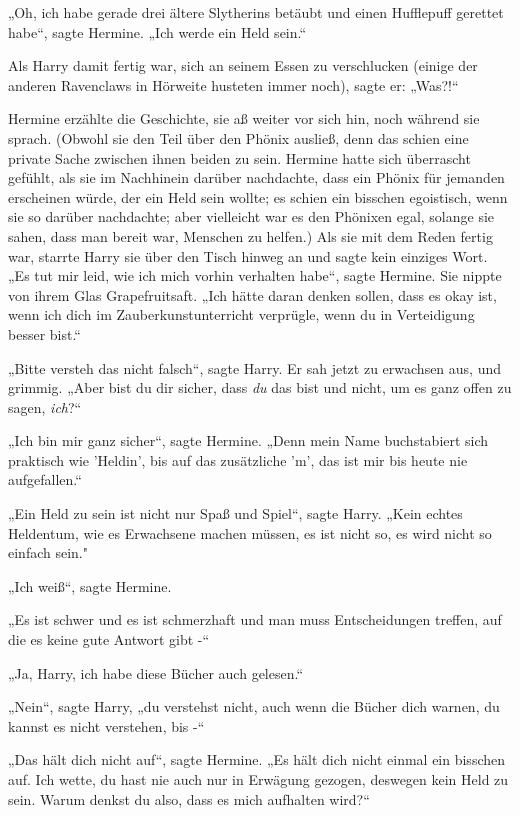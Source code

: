 {„Oh, ich habe gerade drei ältere Slytherins betäubt und einen Hufflepuff gerettet habe“, sagte Hermine. „Ich werde ein Held sein.“

Als Harry damit fertig war, sich an seinem Essen zu verschlucken (einige der anderen Ravenclaws in Hörweite husteten immer noch), sagte er: „Was?!“

Hermine erzählte die Geschichte, sie aß weiter vor sich hin, noch während sie sprach. (Obwohl sie den Teil über den Phönix ausließ, denn das schien eine private Sache zwischen ihnen beiden zu sein. Hermine hatte sich überrascht gefühlt, als sie im Nachhinein darüber nachdachte, dass ein Phönix für jemanden erscheinen würde, der ein Held sein wollte; es schien ein bisschen egoistisch, wenn sie so darüber nachdachte; aber vielleicht war es den Phönixen egal, solange sie sahen, dass man bereit war, Menschen zu helfen.) Als sie mit dem Reden fertig war, starrte Harry sie über den Tisch hinweg an und sagte kein einziges Wort. „Es tut mir leid, wie ich mich vorhin verhalten habe“, sagte Hermine. Sie nippte von ihrem Glas Grapefruitsaft. „Ich hätte daran denken sollen, dass es okay ist, wenn ich dich im Zauberkunstunterricht verprügle, wenn du in Verteidigung besser bist.“

„Bitte versteh das nicht falsch“, sagte Harry. Er sah jetzt zu erwachsen aus, und grimmig. „Aber bist du dir sicher, dass \emph{du} das bist und nicht, um es ganz offen zu sagen, \emph{ich}?“

„Ich bin mir ganz sicher“, sagte Hermine. „Denn mein Name buchstabiert sich praktisch wie 'Heldin', bis auf das zusätzliche 'm', das ist mir bis heute nie aufgefallen.“

„Ein Held zu sein ist nicht nur Spaß und Spiel“, sagte Harry. „Kein echtes Heldentum, wie es Erwachsene machen müssen, es ist nicht so, es wird nicht so einfach sein."

„Ich weiß“, sagte Hermine.

„Es ist schwer und es ist schmerzhaft und man muss Entscheidungen treffen, auf die es keine gute Antwort gibt -“

„Ja, Harry, ich habe diese Bücher auch gelesen.“

„Nein“, sagte Harry, „du verstehst nicht, auch wenn die Bücher dich warnen, du kannst es nicht verstehen, bis -“

„Das hält dich nicht auf“, sagte Hermine. „Es hält dich nicht einmal ein bisschen auf. Ich wette, du hast nie auch nur in Erwägung gezogen, deswegen kein Held zu sein. Warum denkst du also, dass es mich aufhalten wird?“

}

